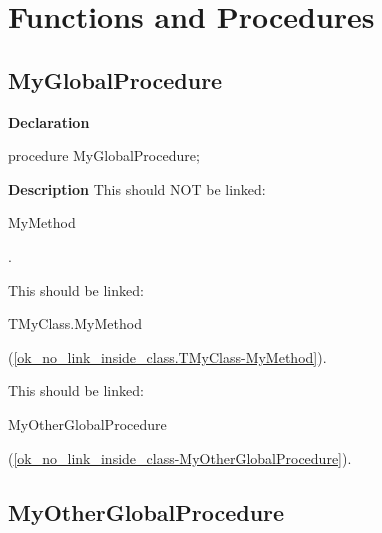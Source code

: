 \documentclass{report}
\newif\ifpdf
\begin{document}
\section{Functions and Procedures}
\ifpdf
\subsection*{\large{\textbf{MyGlobalProcedure}}\normalsize\hspace{1ex}\hrulefill}
\else
\subsection*{MyGlobalProcedure}
\fi
\label{ok_no_link_inside_class-MyGlobalProcedure}
\begin{list}{}{
\setlength{\itemindent}{0cm}
\setlength{\listparindent}{0cm}
\setlength{\leftmargin}{\evensidemargin}
\addtolength{\leftmargin}{\tmplength}
\settowidth{\labelsep}{X}
\addtolength{\leftmargin}{\labelsep}
\setlength{\labelwidth}{\tmplength}
}
\item[\textbf{Declaration}\hfill]
\ifpdf
\begin{flushleft}
\fi
\begin{ttfamily}
procedure MyGlobalProcedure;\end{ttfamily}

\ifpdf
\end{flushleft}
\fi

\par
\item[\textbf{Description}]
This should NOT be linked: \begin{ttfamily}MyMethod\end{ttfamily}.

This should be linked: \begin{ttfamily}TMyClass.MyMethod\end{ttfamily}(\ref{ok_no_link_inside_class.TMyClass-MyMethod}).

This should be linked: \begin{ttfamily}MyOtherGlobalProcedure\end{ttfamily}(\ref{ok_no_link_inside_class-MyOtherGlobalProcedure}).

\end{list}
\ifpdf
\subsection*{\large{\textbf{MyOtherGlobalProcedure}}\normalsize\hspace{1ex}\hrulefill}
\else
\end{document}
